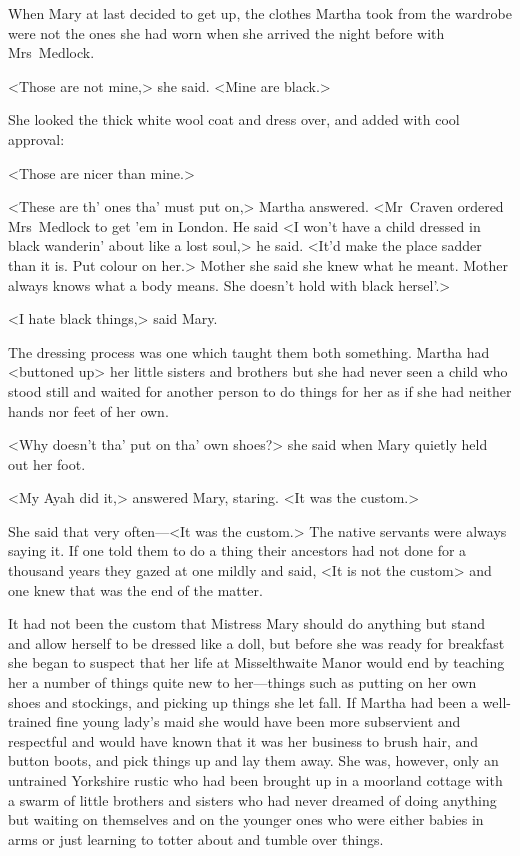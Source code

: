 When Mary at last decided to get up, the clothes Martha took from the wardrobe were not the ones she had worn when she arrived the night before with Mrs~Medlock.

<Those are not mine,> she said. <Mine are black.>

She looked the thick white wool coat and dress over, and added with cool approval:

<Those are nicer than mine.>

<These are th' ones tha' must put on,> Martha answered. <Mr~Craven ordered Mrs~Medlock to get 'em in London. He said <I won't have a child dressed in black wanderin' about like a lost soul,> he said. <It'd make the place sadder than it is. Put colour on her.> Mother she said she knew what he meant. Mother always knows what a body means. She doesn't hold with black hersel'.>

<I hate black things,> said Mary.

The dressing process was one which taught them both something. Martha had <buttoned up> her little sisters and brothers but she had never seen a child who stood still and waited for another person to do things for her as if she had neither hands nor feet of her own.

<Why doesn't tha' put on tha' own shoes?> she said when Mary quietly held out her foot.

<My Ayah did it,> answered Mary, staring. <It was the custom.>

She said that very often—<It was the custom.> The native servants were always saying it. If one told them to do a thing their ancestors had not done for a thousand years they gazed at one mildly and said, <It is not the custom> and one knew that was the end of the matter.

It had not been the custom that Mistress Mary should do anything but stand and allow herself to be dressed like a doll, but before she was ready for breakfast she began to suspect that her life at Misselthwaite Manor would end by teaching her a number of things quite new to her—things such as putting on her own shoes and stockings, and picking up things she let fall. If Martha had been a well-trained fine young lady's maid she would have been more subservient and respectful and would have known that it was her business to brush hair, and button boots, and pick things up and lay them away. She was, however, only an untrained Yorkshire rustic who had been brought up in a moorland cottage with a swarm of little brothers and sisters who had never dreamed of doing anything but waiting on themselves and on the younger ones who were either babies in arms or just learning to totter about and tumble over things.

